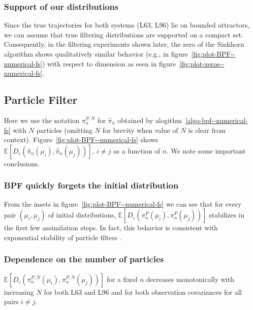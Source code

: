 \subsubsection{Support of our distributions} Since the true trajectories for both systems (L63, L96) lie on bounded attractors, we can assume that true filtering distributions are supported on a compact set. Consequently, in the filtering experiments shown later, the zero of the Sinkhorn algorithm shows qualitatively similar behavior (e.g., in figure~\ref{fig:plot-BPF--numerical-fs}) with respect to dimension as seen in figure~\ref{fig:plot-zeros--numerical-fs}.

\subsection{Particle Filter}
Here we use the notation $\pi^{P, N}_n$ for $\hat\pi_n$ obtained by alogithm~\ref{algo-bpf--numerical-fs} with $N$ particles (omitting $N$ for brevity when value of $N$ is clear from context). Figure~\ref{fig:plot-BPF--numerical-fs} shows $\mathbb E[D_\varepsilon(\hat\pi_n(\mu_i), \hat\pi_n(\mu_j))], \ i \ne j$ as a function of $n$. We note some important conclusions.
\subsubsection{BPF quickly forgets the initial distribution} From the insets in figure~\ref{fig:plot-BPF--numerical-fs} we can see that for every pair $(\mu_i, \mu_j)$ of initial distributions, $\mathbb E\left[D_\varepsilon(\pi^P_n(\mu_i), \pi^P_n(\mu_j))\right]$ stabilizes in the first few assimilation steps. In fact, this behavior is consistent with exponential stability of particle filters \cite{chigansky2009intrinsic}.
\subsubsection{Dependence on the number of particles} 
$\mathbb E\left[D_\varepsilon(\pi^{P, N}_n(\mu_i), \pi^{P, N}_n(\mu_j))\right]$ for a fixed $n$ decreases monotonically with increasing $N$ for both L63 and L96 and for both observation covariances for all pairs $i\neq j$.

